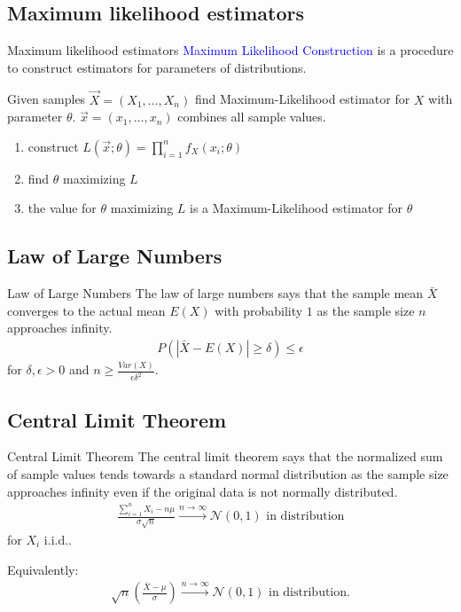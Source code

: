 \documentclass{beamer}
\def\padding{\vspace{0.5cm}}
\def\spadding{\vspace{0.25cm}}
\def\b{\textcolor{blue}}
\begin{document}
\subsection{Maximum likelihood estimators}
\begin{frame}{Maximum likelihood estimators}
    \b{Maximum Likelihood Construction} is a procedure to construct estimators for parameters of distributions.\pause\par\padding
    Given samples $\overrightarrow{X} = (X_1, \dots, X_n)$ find Maximum-Likelihood estimator for $X$ with parameter $\theta$. $\overrightarrow{x} = (x_1, \dots, x_n)$ combines all sample values.
    \begin{enumerate}
        \item construct $L(\overrightarrow{x}; \theta) = \prod_{i=1}^n f_X(x_i; \theta)$
        \item find $\theta$ maximizing $L$
        \item the value for $\theta$ maximizing $L$ is a Maximum-Likelihood estimator for $\theta$
    \end{enumerate}
\end{frame}

\subsection{Law of Large Numbers}
\begin{frame}{Law of Large Numbers}
    The law of large numbers says that the sample mean $\bar{X}$ converges to the actual mean $E(X)$ with probability $1$ as the sample size $n$ approaches infinity.\pause
    \begin{align*}
        P(|\bar{X} - E(X)| \geq \delta) \leq \epsilon
    \end{align*}
    for $\delta, \epsilon > 0$ and $n \geq \frac{Var(X)}{\epsilon \delta^2}$.
\end{frame}

\subsection{Central Limit Theorem}
\begin{frame}{Central Limit Theorem}
    The central limit theorem says that the normalized sum of sample values tends towards a standard normal distribution as the sample size approaches infinity even if the original data is not normally distributed.\pause
    \begin{align*}
        \frac{\sum_{i=1}^n X_i - n \mu}{\sigma \sqrt{n}} \xrightarrow{n \to \infty} \mathcal{N}(0,1) \text{ in distribution}
    \end{align*}
    for $X_i$ i.i.d..\pause\par\spadding
    Equivalently:
    \begin{align*}
        \sqrt{n} \left(\frac{\bar{X} - \mu}{\sigma}\right) \xrightarrow{n \to \infty} \mathcal{N}(0,1) \text{ in distribution}.
    \end{align*}
\end{frame}
\end{document}

